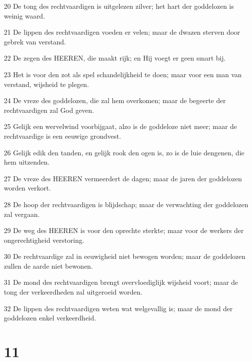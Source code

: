 \par 20 De tong des rechtvaardigen is uitgelezen zilver; het hart der goddelozen is weinig waard.
\par 21 De lippen des rechtvaardigen voeden er velen; maar de dwazen sterven door gebrek van verstand.
\par 22 De zegen des HEEREN, die maakt rijk; en Hij voegt er geen smart bij.
\par 23 Het is voor den zot als spel schandelijkheid te doen; maar voor een man van verstand, wijsheid te plegen.
\par 24 De vreze des goddelozen, die zal hem overkomen; maar de begeerte der rechtvaardigen zal God geven.
\par 25 Gelijk een wervelwind voorbijgaat, alzo is de goddeloze niet meer; maar de rechtvaardige is een eeuwige grondvest.
\par 26 Gelijk edik den tanden, en gelijk rook den ogen is, zo is de luie dengenen, die hem uitzenden.
\par 27 De vreze des HEEREN vermeerdert de dagen; maar de jaren der goddelozen worden verkort.
\par 28 De hoop der rechtvaardigen is blijdschap; maar de verwachting der goddelozen zal vergaan.
\par 29 De weg des HEEREN is voor den oprechte sterkte; maar voor de werkers der ongerechtigheid verstoring.
\par 30 De rechtvaardige zal in eeuwigheid niet bewogen worden; maar de goddelozen zullen de aarde niet bewonen.
\par 31 De mond des rechtvaardigen brengt overvloediglijk wijsheid voort; maar de tong der verkeerdheden zal uitgeroeid worden.
\par 32 De lippen des rechtvaardigen weten wat welgevallig is; maar de mond der goddelozen enkel verkeerdheid.

\chapter{11}


